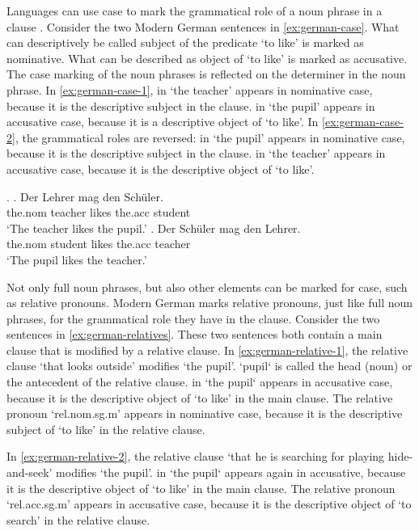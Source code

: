 Languages can use case to mark the grammatical role of a noun phrase in a clause \citep[cf.][]{moravcsik2009}. Consider the two Modern German sentences in \ref{ex:german-case}. What can descriptively be called subject of the predicate  `to like' is marked as nominative. What can be described as object of  `to like' is marked as accusative. The case marking of the noun phrases is reflected on the determiner in the noun phrase.
In \ref{ex:german-case-1},  in  `the teacher' appears in nominative case, because it is the descriptive subject in the clause.  in  `the pupil' appears in accusative case, because it is a descriptive object of  `to like'.
In \ref{ex:german-case-2}, the grammatical roles are reversed:  in  `the pupil' appears in nominative case, because it is the descriptive subject in the clause.  in  `the teacher' appears in accusative case, because it is the descriptive object of  `to like'.

\ex.\label{ex:german-case}
\ag. Der Lehrer mag den Schüler.\\
 the.\ac{nom} teacher likes the.\ac{acc} student\\
 `The teacher likes the pupil.'\label{ex:german-case-1}
\bg. Der Schüler mag den Lehrer.\\
 the.\ac{nom} student likes the.\ac{acc} teacher\\
 `The pupil likes the teacher.'\label{ex:german-case-2}

Not only full noun phrases, but also other elements can be marked for case, such as relative pronouns. Modern German marks relative pronouns, just like full noun phrases, for the grammatical role they have in the clause. Consider the two sentences in \ref{ex:german-relatives}. These two sentences both contain a main clause that is modified by a relative clause.
In \ref{ex:german-relative-1}, the relative clause  `that looks outside' modifies  `the pupil'.  `pupil` is called the head (noun) or the antecedent of the relative clause.  in  `the pupil` appears in accusative case, because it is the descriptive object of  `to like' in the main clause. The relative pronoun  `\ac{rel}.\ac{nom}.\ac{sg}.\ac{m}' appears in nominative case, because it is the descriptive subject of  `to like' in the relative clause.

In \ref{ex:german-relative-2}, the relative clause  `that he is searching for playing hide-and-seek' modifies  `the pupil'.  in  `the pupil` appears again in accusative, because it is the descriptive object of  `to like' in the main clause. The relative pronoun  `\ac{rel}.\ac{acc}.\ac{sg}.\ac{m}' appears in accusative case, because it is the descriptive object of  `to search' in the relative clause.

